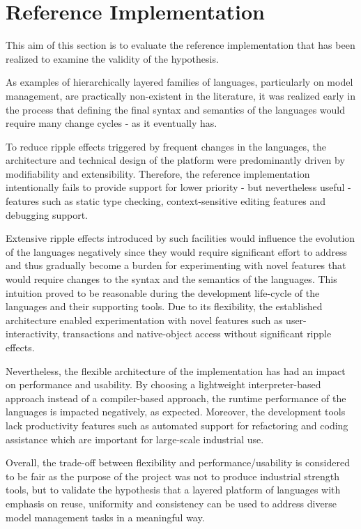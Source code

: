 \section{Reference Implementation}
\label{sec:Evaluation.ReferenceImplementation}

This aim of this section is to evaluate the reference implementation that has been realized to examine the validity of the hypothesis. 

As examples of hierarchically layered families of languages, particularly on model management, are practically non-existent in the literature, it was realized early in the process that defining the final syntax and semantics of the languages would require many change cycles - as it eventually has.

To reduce ripple effects triggered by frequent changes in the languages, the architecture and technical design of the platform were predominantly driven by modifiability and extensibility. Therefore, the reference implementation intentionally fails to provide support for lower priority - but nevertheless useful - features such as static type checking, context-sensitive editing features and debugging support.

Extensive ripple effects introduced by such facilities would influence the evolution of the languages negatively since they would require significant effort to address and thus gradually become a burden for experimenting with novel features that would require changes to the syntax and the semantics of the languages. This intuition proved to be reasonable during the development life-cycle of the languages and their supporting tools. Due to its flexibility, the established architecture enabled experimentation with novel features such as user-interactivity, transactions and native-object access without significant ripple effects. 

Nevertheless, the flexible architecture of the implementation has had an impact on performance and usability. By choosing a lightweight interpreter-based approach instead of a compiler-based approach, the runtime performance of the languages is impacted negatively, as expected. Moreover, the development tools lack productivity features such as automated support for refactoring and coding assistance which are important for large-scale industrial use.

Overall, the trade-off between flexibility and performance/usability is considered to be fair as the purpose of the project was not to produce industrial strength tools, but to validate the hypothesis that a layered platform of languages with emphasis on reuse, uniformity and consistency can be used to address diverse model management tasks in a meaningful way.

